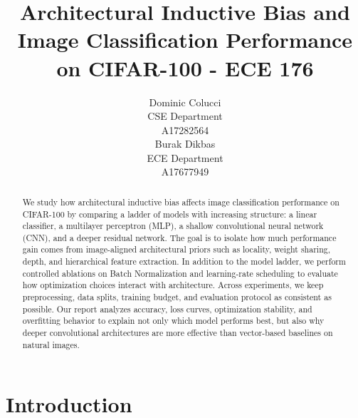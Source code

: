 \documentclass{article}
\title{Architectural Inductive Bias and Image Classification Performance on CIFAR-100 - ECE 176}
\author{%
  Dominic Colucci \\
  CSE Department\\
  A17282564\\
  \And
  Burak Dikbas \\
  ECE Department\\
  A17677949\\
}
\begin{document}
\maketitle

\begin{abstract}

    We study how architectural inductive bias affects image classification performance on CIFAR-100 by comparing a ladder of models with increasing structure: a linear classifier, a multilayer perceptron (MLP), a shallow convolutional neural network (CNN), and a deeper residual network. The goal is to isolate how much performance gain comes from image-aligned architectural priors such as locality, weight sharing, depth, and hierarchical feature extraction. In addition to the model ladder, we perform controlled ablations on Batch Normalization and learning-rate scheduling to evaluate how optimization choices interact with architecture. Across experiments, we keep preprocessing, data splits, training budget, and evaluation protocol as consistent as possible. Our report analyzes accuracy, loss curves, optimization stability, and overfitting behavior to explain not only which model performs best, but also why deeper convolutional architectures are more effective than vector-based baselines on natural images.    

\end{abstract}

\section{Introduction}
\end{document}
